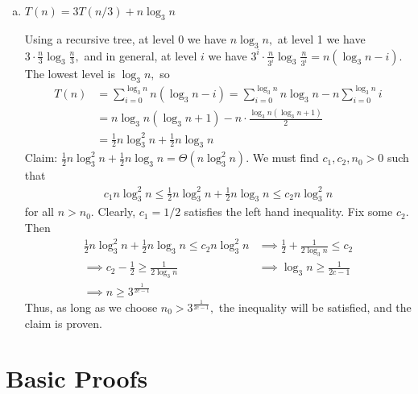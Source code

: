 \documentclass{article}
\begin{document}
\begin{enumerate}[(a)]
	\item $T(n)= 3T(n/3) + n\log_3 n$
		\begin{soln}
			Using a recursive tree, at level 0 we have $n\log_3n,$ at level 1 we have $3\cdot \frac{n}{3}\log_3\frac{n}{3},$ and in general, at level $i$ we have $3^i\cdot \frac{n}{3^i}\log_3\frac{n}{3^i}=n(\log_3n-i).$ The lowest level is $\log_3 n,$ so
			\begin{align*}
				T(n) &= \sum_{i=0}^{\log_3 n}n\left( \log_3n-i \right) = \sum_{i=0}^{\log_3 n}n\log_3n - n\sum_{i=0}^{\log_3n}i \\
				&= n\log_3n\left( \log_3n+1 \right) - n\cdot \frac{\log_3n(\log_3n+1)}{2} \\
				&= \frac{1}{2}n\log_3^2n + \frac{1}{2}n\log_3n
			\end{align*}
			Claim: $\frac{1}{2}n\log_3^2n+\frac{1}{2}n\log_3n = \Theta(n\log_3^2n).$ We must find $c_1, c_2, n_0>0$ such that
			\begin{align*}
				c_1 n\log_3^2n \le \frac{1}{2}n\log_3^2n + \frac{1}{2}n\log_3n \le c_2n\log_3^2n
			\end{align*}
			for all $n>n_0.$ Clearly, $c_1=1/2$ satisfies the left hand inequality. Fix some $c_2.$ Then
			\begin{align*}
				\frac{1}{2}n\log_3^2n+\frac{1}{2}n\log_3n \le c_2n\log_3^2n &\implies \frac{1}{2} + \frac{1}{2\log_3n}\le c_2 \\
				\implies c_2-\frac{1}{2}\ge \frac{1}{2\log_3n} &\implies \log_3n\ge \frac{1}{2c-1} \\
				\implies n\ge 3^{\frac{1}{2c-1}}
			\end{align*}
			Thus, as long as we choose $n_0>3^{\frac{1}{2c-1}},$ the inequality will be satisfied, and the claim is proven.
		\end{soln}
		
\end{enumerate}

\newpage
\section{Basic Proofs}
\end{document}
